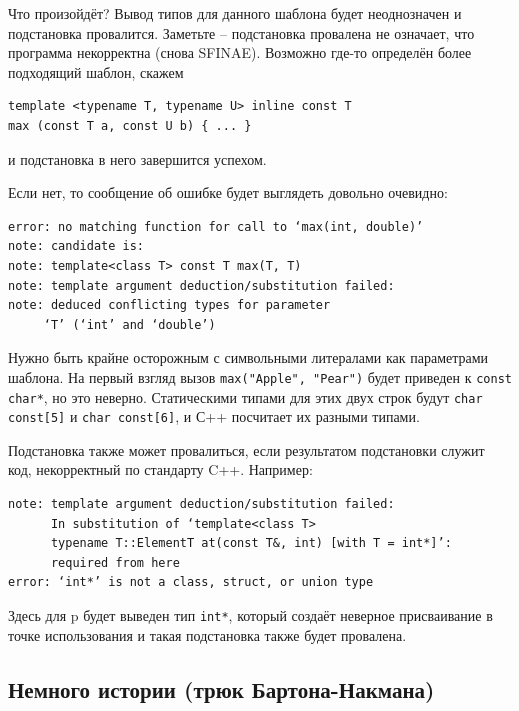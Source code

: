\documentclass[a4paper,12pt,oneside]{article}
\begin{document}
Что произойдёт? Вывод типов для данного шаблона будет неоднозначен и подстановка провалится. Заметьте -- подстановка провалена не означает, что программа некорректна (снова SFINAE). Возможно где-то определён более подходящий шаблон, скажем 

\begin{lstlisting}
template <typename T, typename U> inline const T 
max (const T a, const U b) { ... }
\end{lstlisting}

и подстановка в него завершится успехом.

Если нет, то сообщение об ошибке будет выглядеть довольно очевидно:

\begin{verbatim}
error: no matching function for call to ‘max(int, double)’
note: candidate is:
note: template<class T> const T max(T, T)
note: template argument deduction/substitution failed:
note: deduced conflicting types for parameter 
     ‘T’ (‘int’ and ‘double’)
\end{verbatim}

Нужно быть крайне осторожным с символьными литералами как параметрами шаблона. На первый взгляд вызов \lstinline!max("Apple", "Pear")! будет приведен к \lstinline!const char*!, но это неверно. Статическими типами для этих двух строк будут \lstinline!char const[5]! и \lstinline!char const[6]!, и С++ посчитает их разными типами.

Подстановка также может провалиться, если результатом подстановки служит код, некорректный по стандарту C++. Например:



\begin{verbatim}
note: template argument deduction/substitution failed:
      In substitution of ‘template<class T> 
      typename T::ElementT at(const T&, int) [with T = int*]’:
      required from here
error: ‘int*’ is not a class, struct, or union type
\end{verbatim}

Здесь для p будет выведен тип \lstinline!int*!, который создаёт неверное присваивание в точке использования и такая подстановка также будет провалена.

\subsection{Немного истории (трюк Бартона-Накмана)}
\end{document}
